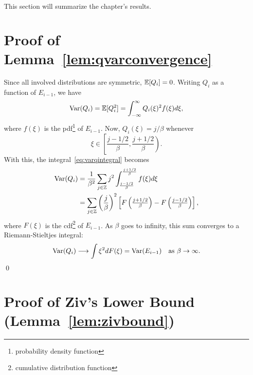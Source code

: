 This section will summarize the chapter's results.




\begin{subappendices}
  \section{Proof of Lemma~\ref{lem:qvarconvergence}}
  \label{app:lemma1proof}

  Since all involved distributions are symmetric, $\mathbb{E}[Q_i] = 0$.  Writing $Q_i$
  as a function of $E_{i-1}$, we have
  \begin{equation}
    \operatorname{Var}(Q_i) = \mathbb{E}[Q_i^2] = \int_{-\infty}^\infty Q_i(\xi)^2 f(\xi) d\xi,
    \label{eq:varqintegral}
  \end{equation}
  where $f(\xi)$ is the pdf\footnote{probability density function} of $E_{i-1}$.
  Now, $Q_i(\xi) = j/\beta$ whenever
  \begin{equation*}
    \xi \in \left[ \frac{j - 1/2}{\beta}, \frac{j + 1/2}{\beta} \right).
  \end{equation*}
  With this, the integral~\eqref{eq:varqintegral} becomes
  \begin{align*}
    \operatorname{Var}(Q_i) &= \frac{1}{\beta^2} \sum_{j \in \mathbb{Z}} j^2 
    \int_{\frac{j - 1/2}{\beta}}^{\frac{j + 1/2}{\beta}} f(\xi) d\xi \\
    &= \sum_{j\in \mathbb{Z}} \left( \frac{j}{\beta} \right)^2 \left[ F\left( 
    { \textstyle
    \frac{j + 1/2}{\beta} }\right) - F \left( { \textstyle \frac{j - 1/2}{\beta}
    } \right) \right],
  \end{align*}
  where $F(\xi)$ is the cdf\footnote{cumulative distribution function} of
  $E_{i-1}$. As $\beta$ goes to infinity, this sum converges to a
  Riemann-Stieltjes integral:
  \begin{equation*}
    \operatorname{Var}(Q_i) \longrightarrow \int \xi^2 dF(\xi) = \operatorname{Var}(E_{i-1}) \quad
    \text{as $\beta \rightarrow \infty$.}
  \end{equation*}
  \qed


  \section{Proof of Ziv's Lower Bound (Lemma~\ref{lem:zivbound})}
  \label{app:zivboundproof}


\end{subappendices}

